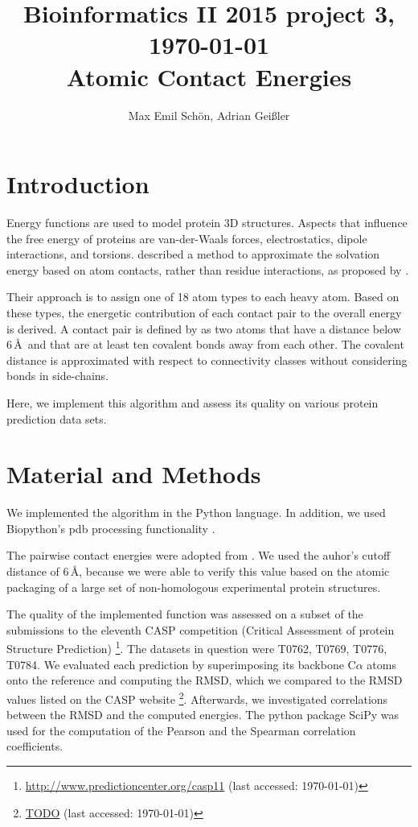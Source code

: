 \documentclass[11pt,a4paper]{article}
\newcommand{\fnurl}[2]{\footnote{\url{#1} (last accessed: #2)}} %
\begin{document}
\title{
  {\small Bioinformatics II 2015 \hfill project 3, \today}\\
   Atomic Contact Energies
}

\author{
Max Emil Schön, Adrian Geißler
}

\maketitle




\section{Introduction}
Energy functions are used to model protein 3D structures. Aspects that influence the free energy of proteins are van-der-Waals forces, electrostatics, dipole interactions, and torsions. \citet{Zhang1997} described a method to approximate the solvation energy based on atom contacts, rather than residue interactions, as proposed by \citet{Miyazawa1996}.

Their approach is to assign one of 18 atom types to each heavy atom. Based on these types, the energetic contribution of each contact pair to the overall energy is derived. A contact pair is defined by \citet{Zhang1997} as two atoms that have a distance below 6\,\AA\ and that are at least ten covalent bonds away from each other. The covalent distance is approximated with respect to connectivity classes without considering bonds in side-chains.

Here, we implement this algorithm and assess its quality on various protein prediction data sets.

\section{Material and Methods}
We implemented the algorithm in the Python language. In addition, we used Biopython's pdb processing functionality \citep{pdb}.

The pairwise contact energies were adopted from \citet{Zhang1997}. We used the auhor's cutoff distance of 6\,\AA, because we were able to verify this value based on the atomic packaging of a large set of non-homologous experimental protein structures.

The quality of the implemented function was assessed on a subset of the submissions to the eleventh CASP competition (Critical Assessment of protein Structure Prediction) \fnurl{http://www.predictioncenter.org/casp11}{\today}. The datasets in question were T0762, T0769, T0776, T0784. We evaluated each prediction by superimposing its backbone C$\alpha$ atoms onto the reference and computing the RMSD, which we compared to the RMSD values listed on the CASP website \fnurl{TODO}{\today}.
Afterwards, we investigated correlations between the RMSD and the computed energies. The python package SciPy \citep{scipy} was used for the computation of the Pearson and the Spearman correlation coefficients.
\end{document}
